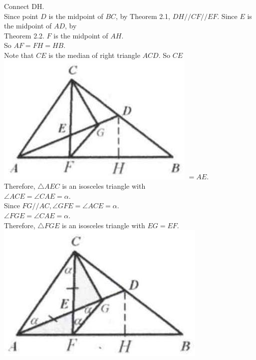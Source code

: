 \documentclass[10pt]{article}
\begin{document}
Connect DH.\\
Since point \(D\) is the midpoint of \(B C\), by Theorem 2.1, \(D H / / C F / / E F\). Since \(E\) is the midpoint of \(A D\), by\\
Theorem 2.2. \(F\) is the midpoint of \(A H\).\\
So \(A F=F H=H B\).\\
Note that \(C E\) is the median of right triangle \(A C D\). So \(C E\)\\
\includegraphics[max width=\textwidth]{2025_04_17_97bc1f7e44d93c271a88g-040} \(=A E\).\\
Therefore, \(\triangle A E C\) is an isosceles triangle with\\
\(\angle A C E=\angle C A E=\alpha\).\\
Since \(F G / / A C, \angle G F E=\angle A C E=\alpha\).\\
\(\angle F G E=\angle C A E=\alpha\).\\
Therefore, \(\triangle F G E\) is an isosceles triangle with \(E G=E F\).\\
\includegraphics[max width=\textwidth, center]{2025_04_17_97bc1f7e44d93c271a88g-040(3)}
\end{document}
